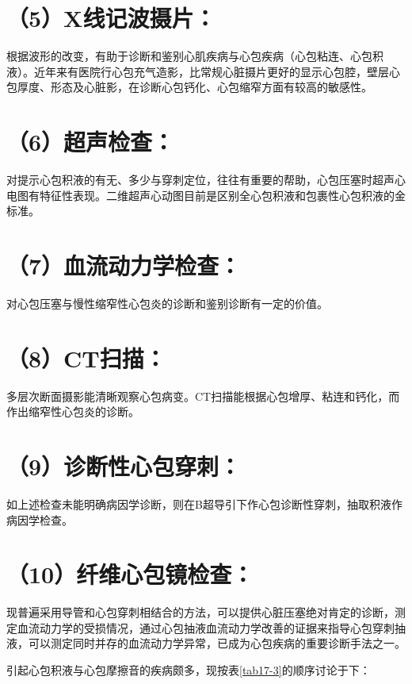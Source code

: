 \section{（5）X线记波摄片：}

根据波形的改变，有助于诊断和鉴别心肌疾病与心包疾病（心包粘连、心包积液）。近年来有医院行心包充气造影，比常规心脏摄片更好的显示心包腔，壁层心包厚度、形态及心脏影，在诊断心包钙化、心包缩窄方面有较高的敏感性。

\section{（6）超声检查：}

对提示心包积液的有无、多少与穿刺定位，往往有重要的帮助，心包压塞时超声心电图有特征性表现。二维超声心动图目前是区别全心包积液和包裹性心包积液的金标准。

\section{（7）血流动力学检查：}

对心包压塞与慢性缩窄性心包炎的诊断和鉴别诊断有一定的价值。

\section{（8）CT扫描：}

多层次断面摄影能清晰观察心包病变。CT扫描能根据心包增厚、粘连和钙化，而作出缩窄性心包炎的诊断。

\section{（9）诊断性心包穿刺：}

如上述检查未能明确病因学诊断，则在B超导引下作心包诊断性穿刺，抽取积液作病因学检查。

\section{（10）纤维心包镜检查：}

现普遍采用导管和心包穿刺相结合的方法，可以提供心脏压塞绝对肯定的诊断，测定血流动力学的受损情况，通过心包抽液血流动力学改善的证据来指导心包穿刺抽液，可以测定同时并存的血流动力学异常，已成为心包疾病的重要诊断手法之一。

引起心包积液与心包摩擦音的疾病颇多，现按表\ref{tab17-3}的顺序讨论于下：

